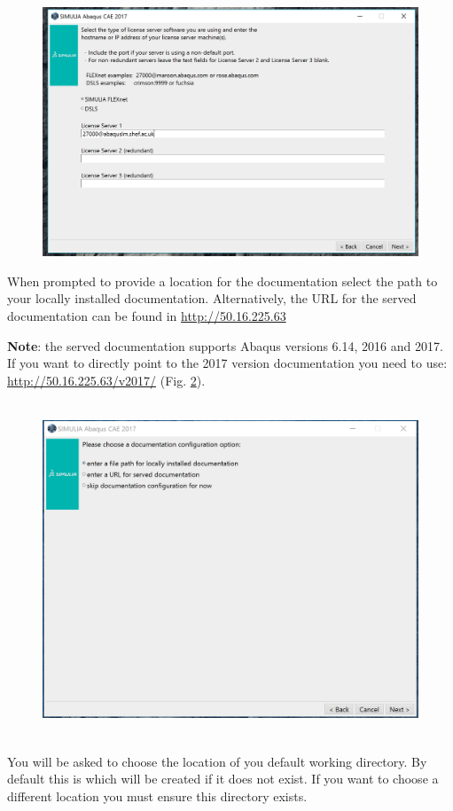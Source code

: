 \documentclass[10pt,a4paper,oneside]{article}
\begin{document}
\begin{figure}[ht]
\centering
	\includegraphics[width=14 cm, height=10 cm]{abaqus_license.png} 
	\caption{}
	\label{fig:abaqus2}
\end{figure}

When prompted to provide a location for the documentation select the path to your locally installed documentation. Alternatively, the URL for the served documentation can be found in \url{http://50.16.225.63} 

\textbf{Note}: the served documentation supports Abaqus versions 6.14, 2016 and 2017. If you want to directly point to the 2017 version documentation you need to use: \url{http://50.16.225.63/v2017/} (Fig. \ref{fig:abaqus3}).

\begin{figure}[ht]
\centering
	\includegraphics[width=14cm, height=10cm]{documentation_CAE.png} 
	\caption{}
	\label{fig:abaqus3}
\end{figure}
\FloatBarrier
You will be asked to choose the location of you default working directory. By default this is \textbf{} which will be created if it does not exist. If you want to choose a different location you must ensure this directory  exists. 
\end{document}
